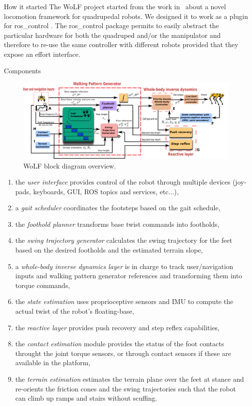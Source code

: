 \begin{myblock}{\large How it started} 
%
The WoLF project started from the work in~\cite{raiola2020} about a novel locomotion framework for quadrupedal robots. 
We designed it to work as a plugin for ros\_control \cite{chitta2017ros_control}. The ros\_control package permits to easily abstract the particular hardware for both the quadruped and/or the manipulator and therefore to re-use the same controller with different robots provided that they expose an effort interface.
%
\end{myblock}

\begin{myblock}{\large Components} 
%
\begin{figure}
	\centering
	\includegraphics[width=\textwidth]{images/block_diagram_updated.pdf}
	\caption{WoLF block diagram overview.}
	\label{fig:diagram}
\end{figure}
\begin{enumerate}[label=\Alph*]
	\item the \emph{user interface} provides control of the robot through multiple devices (joy-pads, keyboards, GUI, ROS topics and services, etc...),
	\item a \emph{gait scheduler} coordinates the footsteps based on the gait schedule,
	\item the \emph{foothold planner} transforms base twist commands into footholds,
	\item the \emph{swing trajectory generator} calculates the swing trajectory for the feet based on the desired footholds and the estimated terrain slope,
	\item a \emph{whole-body inverse dynamics layer} is in charge to track user/navigation inputs and walking pattern generator references and transforming them into torque commands,
	\item the \emph{state estimation} uses proprioceptive sensors and IMU to compute the actual twist of the robot's floating-base,
	\item the \emph{reactive layer} provides push recovery and step reflex capabilities,
	\item the \emph{contact estimation} module provides the status of the foot contacts throught the joint torque sensors, or through contact sensors if these are available in the platform,
	\item the \emph{terrain estimation} estimates the terrain plane over the feet at stance and re-orients the friction cones and the swing trajectories such that the robot can climb up ramps and stairs \cite{focchi2020heuristic} without scuffing.
\end{enumerate}
\end{myblock}

